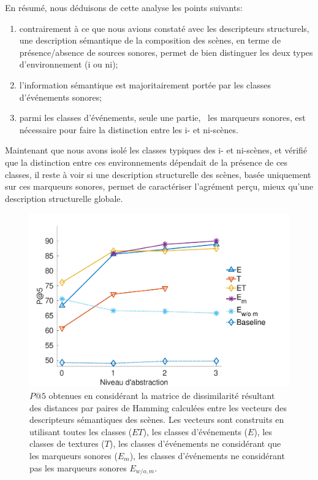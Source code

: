 \documentclass[twoside,twocolumn]{article}
\begin{document}
En résumé, nous déduisons de cette analyse les points suivants:

\begin{enumerate}
\item contrairement à ce que nous avions constaté avec les descripteurs structurels, une description sémantique de la composition des scènes, en terme de présence/absence de sources sonores, permet de bien distinguer les deux types d'environnement (i ou ni);
\item l'information sémantique est majoritairement portée par les classes d'événements sonores;
\item parmi les classes d'événements, seule une partie, \ie~les marqueurs sonores, est nécessaire pour faire la distinction entre les i- et ni-scènes.
\end{enumerate}

Maintenant que nous avons isolé les classes typiques des i- et ni-scènes, et vérifié que la distinction entre ces environnements dépendait de la présence de ces classes, il reste à voir si une description structurelle des scènes, basée uniquement sur ces marqueurs sonores, permet de caractériser l'agrément perçu, mieux qu'une description structurelle globale. 

\begin{figure}[t]
        \myfloatalign
        \includegraphics[width=\linewidth]{gfx/ch_5/pa5_1}
       \caption{$P@5$ obtenues en considérant la matrice de dissimilarité résultant des distances par paires de Hamming calculées entre les vecteurs des descripteurs sémantiques des scènes. Les vecteurs sont construits en utilisant toutes les classes ($ET$), les classes d'événements ($E$), les classes de textures ($T$), les classes d'événements ne considérant que les marqueurs sonores ($E_m$), les classes d'événements ne considérant pas les marqueurs sonores $E_{w/o,m}$.}\label{fig:pa5}
\end{figure}
\end{document}
